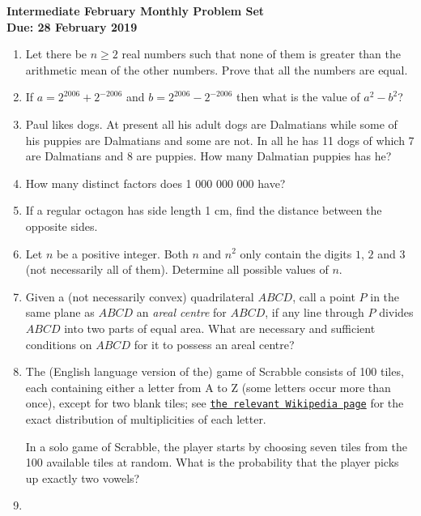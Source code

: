 \documentclass{article}
\begin{document}
\begin{center}
\textbf{\Large Intermediate February Monthly Problem Set}
\\ \vspace{1em}
\textbf{\large Due: 28 February 2019}
\end{center}

\vspace{12pt}

\begin{enumerate}[1.]

\item %
Let there be $n \geq 2$ real numbers such that none of them is greater than the arithmetic mean of the other numbers. Prove that all the numbers are equal.


\item %
If $a = 2^{2006} + 2^{-2006}$ and $b = 2^{2006} - 2^{-2006}$ then what is the value of $a^2 - b^2$?


\item %
Paul likes dogs. At present all his adult dogs are Dalmatians while some of his puppies are Dalmatians and some are not. In all he has 11 dogs of which 7 are Dalmatians and 8 are puppies. How many Dalmatian puppies has he?


\item %
How many distinct factors does 1 000 000 000 have?


\item %
If a regular octagon has side length 1 cm, find the distance between the opposite sides.


\item %
Let $n$ be a positive integer. Both $n$ and $n^2$ only contain the digits $1$, $2$ and $3$ (not necessarily all of them). Determine all possible values of $n$.


\item %
Given a (not necessarily convex) quadrilateral $ABCD$, call a point $P$ in the same plane as $ABCD$ an \emph{areal centre} for $ABCD$, if any line through $P$ divides $ABCD$ into two parts of equal area. What are necessary and sufficient conditions on $ABCD$ for it to possess an areal centre?


\item %
The (English language version of the) game of Scrabble\texttrademark{} consists of 100 tiles, each containing either a letter from A to Z (some letters occur more than once), except for two blank tiles; see \href{https://en.wikipedia.org/wiki/Scrabble_letter_distributions#English}{\texttt{the relevant Wikipedia page}} for the exact distribution of multiplicities of each letter.

In a solo game of Scrabble, the player starts by choosing seven tiles from the 100 available tiles at random. What is the probability that the player picks up exactly two vowels?


\item %


\end{enumerate}
\end{document}
